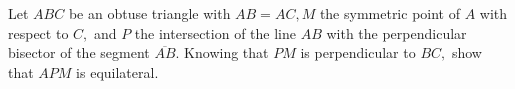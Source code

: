 Let $ ABC $ be an obtuse triangle with $ AB=AC, M $ the symmetric point of $ A $ with respect to $ C, $ and $ P $ the intersection of the line $ AB $ with the perpendicular bisector of the segment $ \overline{AB} . $
Knowing that $ PM $ is perpendicular to $ BC, $ show that $ APM $ is equilateral.